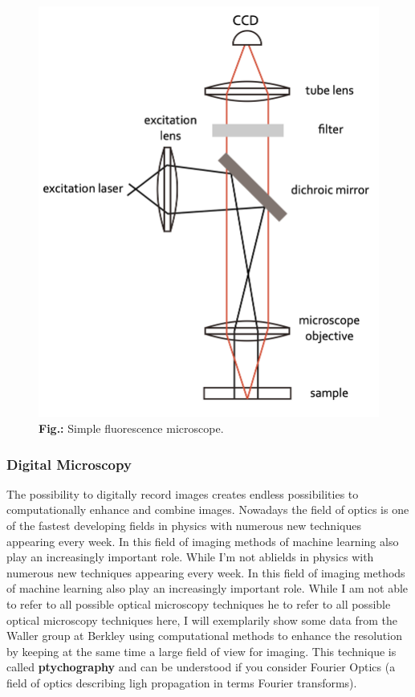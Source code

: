 \documentclass[
  a4paper,
]{book}
\begin{document}
\begin{figure}[H]

{\centering \includegraphics[width=0.4\linewidth,height=\textheight,keepaspectratio]{geometrical-optics/img/fluorescence_micr.png}

}

\caption{\textbf{Fig.:} Simple fluorescence microscope.}

\end{figure}%

\subsubsection{Digital Microscopy}\label{digital-microscopy}

The possibility to digitally record images creates endless possibilities
to computationally enhance and combine images. Nowadays the field of
optics is one of the fastest developing fields in physics with numerous
new techniques appearing every week. In this field of imaging methods of
machine learning also play an increasingly important role. While I'm not
ablields in physics with numerous new techniques appearing every week.
In this field of imaging methods of machine learning also play an
increasingly important role. While I am not able to refer to all
possible optical microscopy techniques he to refer to all possible
optical microscopy techniques here, I will exemplarily show some data
from the Waller group at Berkley using computational methods to enhance
the resolution by keeping at the same time a large field of view for
imaging. This technique is called \textbf{ptychography} and can be
understood if you consider Fourier Optics (a field of optics describing
ligh propagation in terms Fourier transforms).
\end{document}
